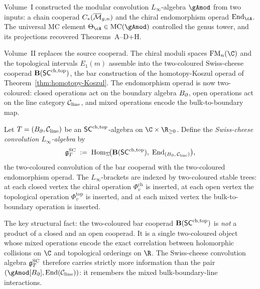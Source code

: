 Volume~I constructed the modular convolution $L_\infty$-algebra
$\gAmod$ from two inputs: a chain cooperad
$C_*(\overline{\mathcal M}_{g,n})$ and the chiral endomorphism operad
$\End_\cA$. The universal MC element
$\Theta_\cA \in \mc(\gAmod)$ controlled the
genus tower, and its projections recovered Theorems~A--D+H\@.

Volume~II replaces the source cooperad. The chiral moduli spaces
$\FM_n(\C)$ and the topological intervals $E_1(m)$ assemble into
the two-coloured Swiss-cheese cooperad
$\mathbf{B}(\mathsf{SC}^{\mathrm{ch,top}})$, the bar construction of the homotopy-Koszul
operad of Theorem~\ref{thm:homotopy-Koszul}.
The endomorphism operad is now two-coloured:
closed operations act on the boundary algebra $B_{\partial}$,
open operations act on the line category $\mathcal C_{\mathrm{line}}$,
and mixed operations encode the bulk-to-boundary map.

\begin{definition}
\label{def:sc-convolution}
Let $T = (B_{\partial}, \mathcal C_{\mathrm{line}})$ be an $\mathsf{SC}^{\mathrm{ch,top}}$-algebra
on $\C \times \R_{\ge 0}$. Define the \emph{Swiss-cheese
convolution $L_\infty$-algebra} by
\begin{equation}\label{eq:gSC-def}
\mathfrak{g}^{\mathrm{SC}}_T
\;:=\;
\operatorname{Hom}_{\Sigma}\!\bigl(
 \mathbf{B}(\mathsf{SC}^{\mathrm{ch,top}}),\;
 \operatorname{End}_{(B_{\partial},\,\mathcal C_{\mathrm{line}})}
\bigr),
\end{equation}
the two-coloured convolution of the bar cooperad with the
two-coloured endomorphism operad. The $L_\infty$-brackets are
indexed by two-coloured stable trees: at each closed vertex the
chiral operation $\Phi_v^{\mathrm{ch}}$ is inserted, at each open
vertex the topological operation $\Phi_v^{\mathrm{top}}$ is
inserted, and at each mixed vertex the bulk-to-boundary operation
is inserted.
\end{definition}

The key structural fact: the two-coloured bar cooperad
$\mathbf{B}(\mathsf{SC}^{\mathrm{ch,top}})$ is \emph{not} a product of a closed and an
open cooperad. It is a single two-coloured object whose mixed
operations encode the exact correlation between holomorphic
collisions on $\C$ and topological orderings on $\R$. The
Swiss-cheese convolution algebra $\mathfrak{g}^{\mathrm{SC}}_T$ therefore carries
strictly more information than the pair $(\gAmod[\Bbound],
\End(\cC_{\mathrm{line}}))$: it remembers the mixed
bulk-boundary-line interactions.

